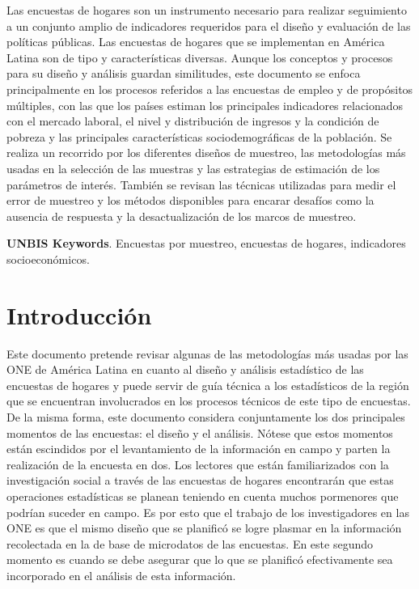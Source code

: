 \documentclass[
  12pt,
]{book}
\begin{document}
Las encuestas de hogares son un instrumento necesario para realizar seguimiento a un conjunto amplio de indicadores requeridos para el diseño y evaluación de las políticas públicas. Las encuestas de hogares que se implementan en América Latina son de tipo y características diversas. Aunque los conceptos y procesos para su diseño y análisis guardan similitudes, este documento se enfoca principalmente en los procesos referidos a las encuestas de empleo y de propósitos múltiples, con las que los países estiman los principales indicadores relacionados con el mercado laboral, el nivel y distribución de ingresos y la condición de pobreza y las principales características sociodemográficas de la población. Se realiza un recorrido por los diferentes diseños de muestreo, las metodologías más usadas en la selección de las muestras y las estrategias de estimación de los parámetros de interés. También se revisan las técnicas utilizadas para medir el error de muestreo y los métodos disponibles para encarar desafíos como la ausencia de respuesta y la desactualización de los marcos de muestreo.

\textbf{UNBIS Keywords}. Encuestas por muestreo, encuestas de hogares, indicadores socioeconómicos.

\hypertarget{introducciuxf3n}{%
\chapter{Introducción}\label{introducciuxf3n}}

Este documento pretende revisar algunas de las metodologías más usadas por las ONE de América Latina en cuanto al diseño y análisis estadístico de las encuestas de hogares y puede servir de guía técnica a los estadísticos de la región que se encuentran involucrados en los procesos técnicos de este tipo de encuestas. De la misma forma, este documento considera conjuntamente los dos principales momentos de las encuestas: el diseño y el análisis. Nótese que estos momentos están escindidos por el levantamiento de la información en campo y parten la realización de la encuesta en dos. Los lectores que están familiarizados con la investigación social a través de las encuestas de hogares encontrarán que estas operaciones estadísticas se planean teniendo en cuenta muchos pormenores que podrían suceder en campo. Es por esto que el trabajo de los investigadores en las ONE es que el mismo diseño que se planificó se logre plasmar en la información recolectada en la de base de microdatos de las encuestas. En este segundo momento es cuando se debe asegurar que lo que se planificó efectivamente sea incorporado en el análisis de esta información.
\end{document}
